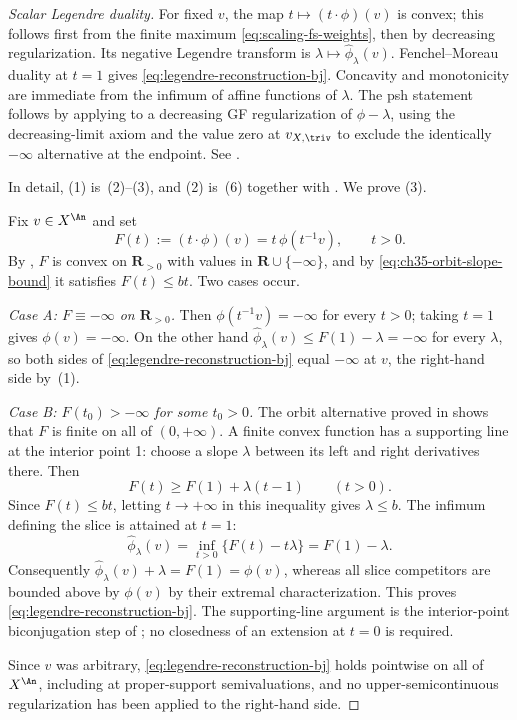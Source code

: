\begin{proof}[Scalar Legendre duality]
For fixed $v$, the map $t\mapsto(t\cdot\phi)(v)$ is convex; this follows
first from the finite maximum \eqref{eq:scaling-fs-weights}, then by
decreasing regularization.  Its negative Legendre transform is
$\lambda\mapsto\widehat\phi_\lambda(v)$.  Fenchel--Moreau duality at
$t=1$ gives \eqref{eq:legendre-reconstruction-bj}.  Concavity and
monotonicity are immediate from the infimum of affine functions of
$\lambda$.  The psh statement follows by applying
 to a decreasing GF regularization
of $\phi-\lambda$, using the decreasing-limit axiom and the value zero at
$v_{X,\triv}$ to exclude the identically $-\infty$ alternative at the
endpoint.  See \cite[Lemma~6.23 and Theorem~6.24]{BJ22}.

In detail, (1) is \,(2)--(3), and (2) is
\,(6) together with
.  We prove (3).

Fix $v\in X^{\An}$ and set
\[
 F(t):=(t\cdot\phi)(v)=t\,\phi(t^{-1}v),\qquad t>0 .
\]
By , $F$ is convex on
$\mathbf R_{>0}$ with values in $\mathbf R\cup\{-\infty\}$, and by
\eqref{eq:ch35-orbit-slope-bound} it satisfies $F(t)\leq bt$. Two cases
occur.

\emph{Case A: $F\equiv-\infty$ on $\mathbf R_{>0}$.}  Then
$\phi(t^{-1}v)=-\infty$ for every $t>0$; taking $t=1$ gives
$\phi(v)=-\infty$.  On the other hand
$\widehat\phi_\lambda(v)\leq F(1)-\lambda=-\infty$ for every
$\lambda$, so both sides of
\eqref{eq:legendre-reconstruction-bj} equal $-\infty$ at $v$, the
right-hand side by \,(1).

\emph{Case B: $F(t_0)>-\infty$ for some $t_0>0$.} The orbit alternative
proved in  shows that $F$ is finite on all
of $(0,+\infty)$. A finite convex function has a supporting line at the
interior point 1: choose a slope $\lambda$ between its left and right
derivatives there. Then
\[
 F(t)\geq F(1)+\lambda(t-1)\qquad(t>0).
\]
Since $F(t)\leq bt$, letting $t\to+\infty$ in this inequality gives
$\lambda\leq b$. The infimum defining the slice is attained at $t=1$:
\[
 \widehat\phi_\lambda(v)=\inf_{t>0}\{F(t)-t\lambda\}
 =F(1)-\lambda.
\]
Consequently $\widehat\phi_\lambda(v)+\lambda=F(1)=\phi(v)$, whereas
all slice competitors are bounded above by $\phi(v)$ by their extremal
characterization. This proves \eqref{eq:legendre-reconstruction-bj}.
The supporting-line argument is the interior-point biconjugation step of
; no closedness of an extension at $t=0$
is required.

Since $v$ was arbitrary, \eqref{eq:legendre-reconstruction-bj} holds
pointwise on all of $X^{\An}$, including at proper-support
semivaluations, and no upper-semicontinuous regularization has been applied
to the right-hand side.
\end{proof}

